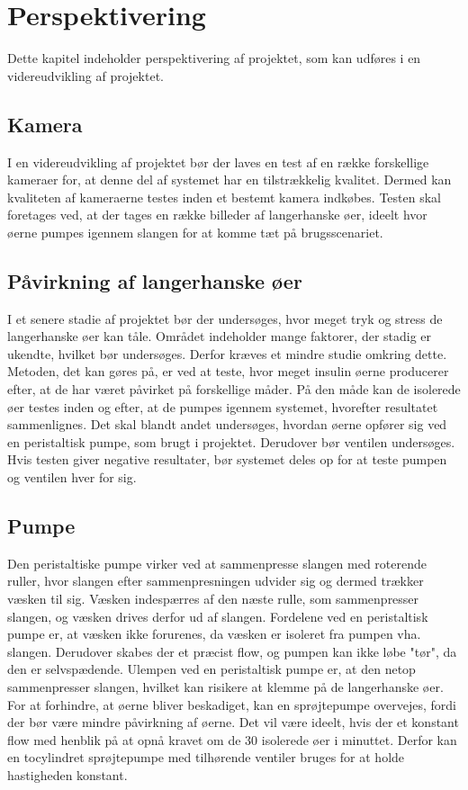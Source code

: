 \chapter{Perspektivering}
Dette kapitel indeholder perspektivering af projektet, som kan udføres i en videreudvikling af projektet.
\section{Kamera}
 I en videreudvikling af projektet bør der laves en test af en række forskellige kameraer for, at denne del af systemet har en tilstrækkelig kvalitet. Dermed kan kvaliteten af kameraerne testes inden et bestemt kamera indkøbes. Testen skal foretages ved, at der tages en række billeder af langerhanske øer, ideelt hvor øerne pumpes igennem slangen for at komme tæt på brugsscenariet. 

\section{Påvirkning af langerhanske øer}
I et senere stadie af projektet bør der undersøges, hvor meget tryk og stress de langerhanske øer kan tåle. Området indeholder mange faktorer, der stadig er ukendte, hvilket bør undersøges. Derfor kræves et mindre studie omkring dette. Metoden, det kan gøres på, er ved at teste, hvor meget insulin øerne producerer efter, at de har været påvirket på forskellige måder. På den måde kan de isolerede øer testes inden og efter, at de pumpes igennem systemet, hvorefter  resultatet sammenlignes. Det skal blandt andet undersøges, hvordan øerne opfører sig ved en peristaltisk pumpe, som brugt i projektet. Derudover bør ventilen undersøges. Hvis testen giver negative resultater, bør systemet deles op for at teste pumpen og ventilen hver for sig.

\section{Pumpe}
Den peristaltiske pumpe virker ved at sammenpresse slangen med roterende ruller, hvor slangen efter sammenpresningen udvider sig  og dermed trækker væsken til sig. Væsken indespærres af den næste rulle, som sammenpresser slangen, og væsken drives derfor ud af slangen. Fordelene ved en peristaltisk pumpe er, at væsken ikke forurenes, da væsken er isoleret fra pumpen vha. slangen. Derudover skabes der et præcist flow, og pumpen kan ikke løbe "tør", da den er selvspædende. Ulempen ved en peristaltisk pumpe er, at den netop sammenpresser slangen, hvilket kan risikere at klemme på de langerhanske øer. For at forhindre, at øerne bliver beskadiget, kan en sprøjtepumpe overvejes, fordi der bør være mindre påvirkning af øerne. Det vil være ideelt, hvis der et konstant flow med henblik på at opnå kravet om de 30 isolerede øer i minuttet. Derfor kan en tocylindret sprøjtepumpe med tilhørende ventiler bruges for at holde hastigheden konstant. 

